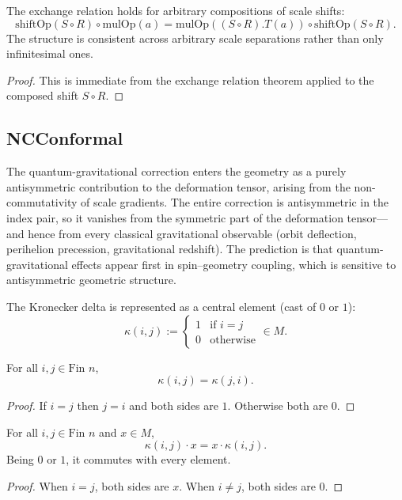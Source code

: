 \begin{theorem}
The exchange relation holds for arbitrary compositions of scale shifts:
\[
\text{shiftOp}(S \circ R) \circ \text{mulOp}(a) = \text{mulOp}((S \circ R).T(a)) \circ \text{shiftOp}(S \circ R) .
\]
The structure is consistent across arbitrary scale separations rather than only infinitesimal ones.
\begin{proof}
This is immediate from the exchange relation theorem applied to the composed shift $S \circ R$.
\end{proof}
\end{theorem}

\subsection{NCConformal}

The quantum-gravitational correction enters the geometry as a purely antisymmetric contribution to the deformation tensor, arising from the non-commutativity of scale gradients. The entire correction is antisymmetric in the index pair, so it vanishes from the symmetric part of the deformation tensor—and hence from every classical gravitational observable (orbit deflection, perihelion precession, gravitational redshift). The prediction is that quantum-gravitational effects appear first in spin–geometry coupling, which is sensitive to antisymmetric geometric structure.

\begin{definition}
The Kronecker delta is represented as a central element (cast of $0$ or $1$):
\[
\kappa(i,j) := \begin{cases} 1 & \text{if } i = j \\ 0 & \text{otherwise} \end{cases} \in M .
\]
\end{definition}

\begin{theorem}
For all $i, j \in \text{Fin } n$,
\[
\kappa(i,j) = \kappa(j,i) .
\]
\begin{proof}
If $i = j$ then $j = i$ and both sides are $1$. Otherwise both are $0$.
\end{proof}
\end{theorem}

\begin{theorem}
For all $i, j \in \text{Fin } n$ and $x \in M$,
\[
\kappa(i,j) \cdot x = x \cdot \kappa(i,j) .
\]
Being $0$ or $1$, it commutes with every element.
\begin{proof}
When $i = j$, both sides are $x$. When $i \ne j$, both sides are $0$.
\end{proof}
\end{theorem}

